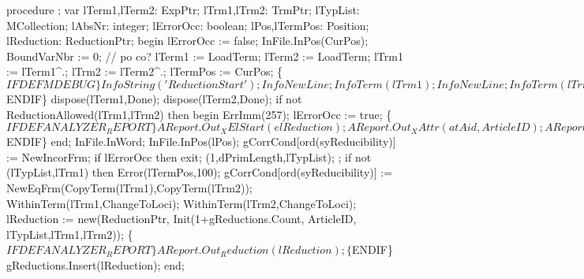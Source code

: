 procedure ;
var
   lTerm1,lTerm2: ExpPtr;
   lTrm1,lTrm2: TrmPtr;
   lTypList: MCollection;
   lAbsNr: integer;
   lErrorOcc: boolean;
   lPos,lTermPos: Position;
   lReduction: ReductionPtr;
begin
   lErrorOcc := false;
   InFile.InPos(CurPos);
   BoundVarNbr := 0; // po co?
   lTerm1 := LoadTerm;
   lTerm2 := LoadTerm;
   lTrm1 := lTerm1^.;
   lTrm2 := lTerm2^.;
   lTermPos := CurPos;
   \{$IFDEF MDEBUG\}
   InfoString('Reduction Start'); InfoNewLine;
   InfoTerm(lTrm1); InfoNewLine;
   InfoTerm(lTrm2); InfoNewLine;
   InfoString('Reduction End'); InfoNewLine;
   \{$ENDIF\}
   dispose(lTerm1,Done);
   dispose(lTerm2,Done);
   if not ReductionAllowed(lTrm1,lTrm2) then
   begin
      ErrImm(257);
      lErrorOcc := true;
      \{$IFDEF ANALYZER_REPORT\}
      AReport.Out_XElStart(elReduction); 
      AReport.Out_XAttr(atAid, ArticleID);
      AReport.Out_XIntAttr(atNr, 0);
      AReport.Out_XAttrEnd; 
      AReport.Out_XEl1(elErrorReduction);
      AReport.Out_XElEnd(elReduction);
      \{$ENDIF\}
   end;  
   InFile.InWord; InFile.InPos(lPos);
   gCorrCond[ord(syReducibility)] := NewIncorFrm;
   if lErrorOcc then exit;
   (1,dPrimLength,lTypList);
   ;
   if not (lTypList,lTrm1) then Error(lTermPos,100);
   gCorrCond[ord(syReducibility)] := NewEqFrm(CopyTerm(lTrm1),CopyTerm(lTrm2));
   WithinTerm(lTrm1,ChangeToLoci);
   WithinTerm(lTrm2,ChangeToLoci);
   lReduction := new(ReductionPtr,
                             Init(1+gReductions.Count, ArticleID,
                                  lTypList,lTrm1,lTrm2));
   \{$IFDEF ANALYZER_REPORT\}
   AReport.Out_Reduction(lReduction);
   \{$ENDIF\}
   gReductions.Insert(lReduction);
end;
\eatline
{}\nwendcode{}\nwdocspar
